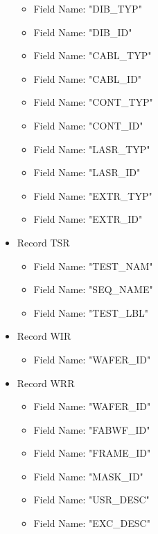 \documentclass[letterpaper]{article}
\begin{document}
\begin{itemize}
\begin{itemize}
    \item Field Name: "DIB\_TYP"
    \item Field Name: "DIB\_ID"
    \item Field Name: "CABL\_TYP"
    \item Field Name: "CABL\_ID"
    \item Field Name: "CONT\_TYP"
    \item Field Name: "CONT\_ID"
    \item Field Name: "LASR\_TYP"
    \item Field Name: "LASR\_ID"
    \item Field Name: "EXTR\_TYP"
    \item Field Name: "EXTR\_ID"
    \end{itemize}
\item Record TSR
    \begin{itemize}
    \item Field Name: "TEST\_NAM"
    \item Field Name: "SEQ\_NAME"
    \item Field Name: "TEST\_LBL"
    \end{itemize}
\item Record WIR
    \begin{itemize}
    \item Field Name: "WAFER\_ID"
    \end{itemize}
\item Record WRR
    \begin{itemize}
    \item Field Name: "WAFER\_ID"
    \item Field Name: "FABWF\_ID"
    \item Field Name: "FRAME\_ID"
    \item Field Name: "MASK\_ID"
    \item Field Name: "USR\_DESC"
    \item Field Name: "EXC\_DESC"
    \end{itemize}
\end{itemize}
\end{document}
